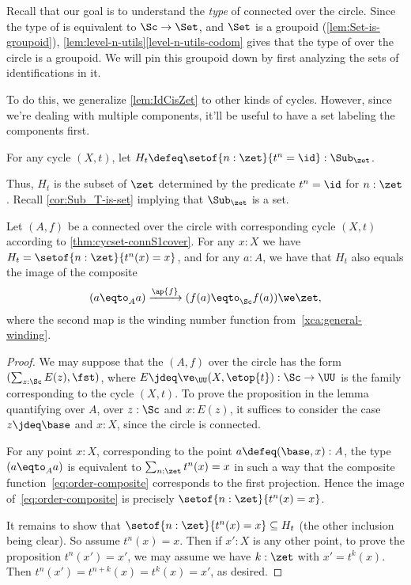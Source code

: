 Recall that our goal is to understand the \emph{type} of connected
\coverings over the circle. Since the type of \coverings is
equivalent to $\Sc\to \Set$, and $\Set$ is a groupoid
(\cref{lem:Set-is-groupoid}),
\cref{lem:level-n-utils}\ref{level-n-utils-codom} gives
that the type of \coverings over the circle is a groupoid.
We will pin this groupoid down by first analyzing the sets of
identifications in it.

To do this, we generalize \cref{lem:IdCisZet} to other kinds of cycles.
However, since we're dealing with multiple components,
it'll be useful to have a set labeling the components first.
\begin{definition}\label{def:subgroup-zet-of-cycle}
  For any cycle $(X,t)$,
  let $H_t \defeq \setof{n:\zet}{t^n=\id} : \Sub_\zet$.
\end{definition}
Thus, $H_t$ is the subset of $\zet$ determined by the predicate $t^n=\id$
for $n:\zet$.
Recall \cref{cor:Sub_T-is-set} implying that $\Sub_\zet$ is a set.
\begin{lemma}\label{lem:cycle-order-point-ap}
  Let $(A,f)$ be a connected \covering over the circle
  with corresponding cycle $(X,t)$ according to \cref{thm:cycset-connS1cover}.
  For any $x:X$ we have $H_t = \setof{n:\zet}{t^n(x)=x}$,
  and for any $a:A$, we have that $H_t$
  also equals the image of the composite
  \begin{equation}\label{eq:order-composite}
    (a \eqto_A a) \xrightarrow{\ap{f}}{} (f(a) \eqto_\Sc f(a)) \we \zet,
  \end{equation}
  where the second map is the winding number function
  from~\cref{xca:general-winding}.
\end{lemma}
\begin{proof}
  We may suppose that the \covering $(A,f)$ over the circle
  has the form $(\sum_{z:\Sc} E(z),\fst)$, where
  $E\jdeq\ve_\UU(X,\etop{t}) : \Sc\to\UU$ is the family corresponding
  to the cycle $(X,t)$.
  To prove the proposition in the lemma quantifying over $A$, \ie
  over $z:\Sc$ and $x:E(z)$, it suffices to consider the case
  $z\jdeq\base$ and $x:X$, since the circle is connected.

  For any point $x:X$, corresponding to the point $a\defeq(\base,x):A$,
  the type $(a \eqto_A a)$ is equivalent to $\sum_{n:\zet}t^n(x)=x$
  in such a way that the composite function~\eqref{eq:order-composite}
  corresponds to the first projection.
  Hence the image of~\eqref{eq:order-composite} is precisely
  $\setof{n:\zet}{t^n(x)=x}$.

  It remains to show that $\setof{n:\zet}{t^n(x)=x} \subseteq H_t$
  (the other inclusion being clear).
  So assume $t^n(x)=x$.
  Then if $x':X$ is any other point, to prove the proposition
  $t^n(x')=x'$, we may assume we have $k:\zet$ with $x'=t^k(x)$. Then
  $t^n(x')=t^{n+k}(x)=t^k(x)=x'$, as desired.
\end{proof}


